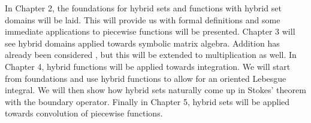 In Chapter 2, the foundations for hybrid sets and functions with hybrid set domains will be laid. 
This will provide us with formal definitions and some immediate applications to piecewise functions will be presented.
Chapter 3 will see hybrid domains applied towards symbolic matrix algebra.
Addition has already been considered \cite{carette2010}, but this will be extended to multiplication as well.
In Chapter 4, hybrid functions will be applied towards integration. 
We will start from foundations and use hybrid functions to allow for an oriented Lebesgue integral.
We will then show how hybrid sets naturally come up in Stokes' theorem with the boundary operator.
Finally in Chapter 5, hybrid sets will be applied towards convolution of piecewise functions.


















